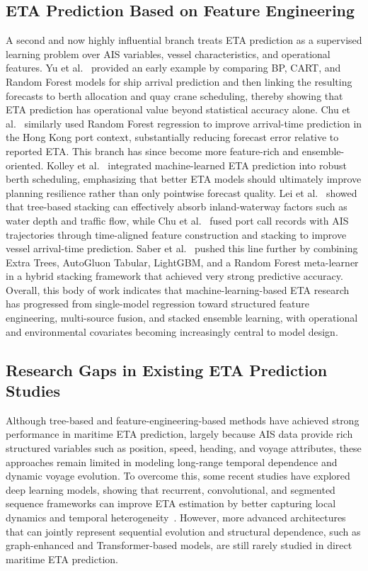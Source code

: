 \documentclass[conference]{IEEEtran}
\begin{document}
\subsection{ETA Prediction Based on Feature Engineering}
A second and now highly influential branch treats ETA prediction as a supervised learning problem over AIS variables, vessel characteristics, and operational features. Yu et al.~\cite{yuShipArrivalPrediction2018} provided an early example by comparing BP, CART, and Random Forest models for ship arrival prediction and then linking the resulting forecasts to berth allocation and quay crane scheduling, thereby showing that ETA prediction has operational value beyond statistical accuracy alone. Chu et al.~\cite{chuEvaluationPredictionPunctuality2023} similarly used Random Forest regression to improve arrival-time prediction in the Hong Kong port context, substantially reducing forecast error relative to reported ETA. This branch has since become more feature-rich and ensemble-oriented. Kolley et al.~\cite{kolleyRobustBerthScheduling2022} integrated machine-learned ETA prediction into robust berth scheduling, emphasizing that better ETA models should ultimately improve planning resilience rather than only pointwise forecast quality. Lei et al.~\cite{leiPredictingVesselArrival2024} showed that tree-based stacking can effectively absorb inland-waterway factors such as water depth and traffic flow, while Chu et al.~\cite{chuVesselArrivalTime2025} fused port call records with AIS trajectories through time-aligned feature construction and stacking to improve vessel arrival-time prediction. Saber et al.~\cite{saberHighaccuracyPredictionVessels2025} pushed this line further by combining Extra Trees, AutoGluon Tabular, LightGBM, and a Random Forest meta-learner in a hybrid stacking framework that achieved very strong predictive accuracy. Overall, this body of work indicates that machine-learning-based ETA research has progressed from single-model regression toward structured feature engineering, multi-source fusion, and stacked ensemble learning, with operational and environmental covariates becoming increasingly central to model design.

\subsection{Research Gaps in Existing ETA Prediction Studies}
Although tree-based and feature-engineering-based methods have achieved strong performance in maritime ETA prediction, largely because AIS data provide rich structured variables such as position, speed, heading, and voyage attributes, these approaches remain limited in modeling long-range temporal dependence and dynamic voyage evolution. To overcome this, some recent studies have explored deep learning models, showing that recurrent, convolutional, and segmented sequence frameworks can improve ETA estimation by better capturing local dynamics and temporal heterogeneity~\cite{elmekkaouiDeepLearningModels2022,wenzelNeuralNetworkApproach2023,duSegmentedETAPrediction2025}. However, more advanced architectures that can jointly represent sequential evolution and structural dependence, such as graph-enhanced and Transformer-based models, are still rarely studied in direct maritime ETA prediction.
\end{document}
